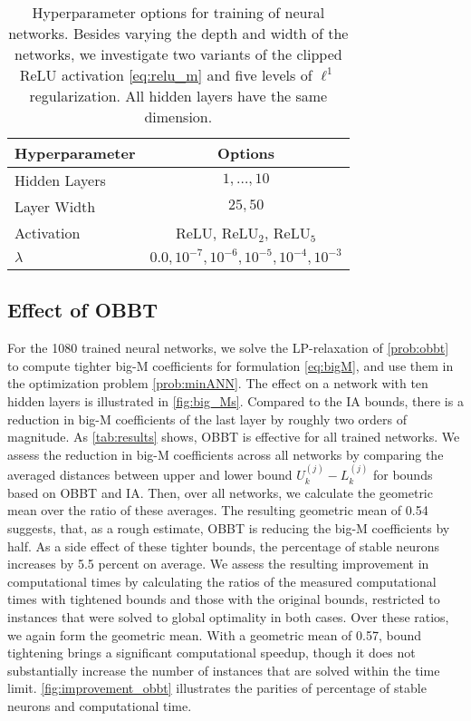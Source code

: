\begin{table}[ht]
    \centering
    \caption{Hyperparameter options for training of neural networks. Besides varying the depth and width of the networks, we investigate two variants of the clipped ReLU activation \eqref{eq:relu_m} and five levels of $\ell^1$ regularization. All hidden layers have the same dimension.}
    \label{table:hyperparameter}
    \begin{tabular}{l c } 
        \toprule 
        Hyperparameter & Options \\ \midrule
        Hidden Layers & $1,\ldots,10$  \\
        Layer Width &  $25,50$ \\
        Activation & ReLU, ReLU$_2$, ReLU$_5$ \\ 
        $\lambda$ &  $0.0, 10^{-7}, 10^{-6},10^{-5}, 10^{-4}, 10^{-3}$\\ \bottomrule 
    \end{tabular}
\end{table}

\subsection{Effect of OBBT}

For the 1080 trained neural networks, we solve the LP-relaxation of \eqref{prob:obbt} to compute tighter big-M coefficients for formulation \eqref{eq:bigM}, and use them in the optimization problem \eqref{prob:minANN}. The effect on a network with ten hidden layers is illustrated in \vref{fig:big_Ms}. Compared to the IA bounds, there is a reduction in big-M coefficients of the last layer by roughly two orders of magnitude. As \vref{tab:results} shows, OBBT is effective for all trained networks. We assess the reduction in big-M coefficients across all networks by comparing the averaged distances between upper and lower bound $U^{(j)}_k -L^{(j)}_k$ for bounds based on OBBT and IA. Then, over all networks, we calculate the geometric mean over the ratio of these averages. The resulting geometric mean of 0.54 suggests, that, as a rough estimate, OBBT is reducing the big-M coefficients by half. 
As a side effect of these tighter bounds, the percentage of stable neurons increases by 5.5 percent on average. We assess the resulting improvement in computational times by calculating the ratios of the measured  computational times with tightened bounds and those with the original bounds, restricted to instances that were solved to global optimality in both cases. Over these ratios, we again form the geometric mean. With a geometric mean of 0.57, bound tightening brings a significant computational speedup, though it does not substantially increase the number of instances that are solved within the time limit. \vref{fig:improvement_obbt} illustrates the parities of percentage of stable neurons and computational time.


